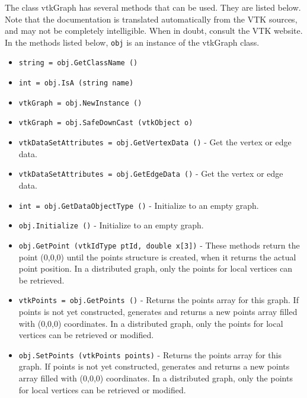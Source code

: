 The class vtkGraph has several methods that can be used.
  They are listed below.
Note that the documentation is translated automatically from the VTK sources,
and may not be completely intelligible.  When in doubt, consult the VTK website.
In the methods listed below, \verb|obj| is an instance of the vtkGraph class.
\begin{itemize}
\item  \verb|string = obj.GetClassName ()|

\item  \verb|int = obj.IsA (string name)|

\item  \verb|vtkGraph = obj.NewInstance ()|

\item  \verb|vtkGraph = obj.SafeDownCast (vtkObject o)|

\item  \verb|vtkDataSetAttributes = obj.GetVertexData ()| -  Get the vertex or edge data.

\item  \verb|vtkDataSetAttributes = obj.GetEdgeData ()| -  Get the vertex or edge data.

\item  \verb|int = obj.GetDataObjectType ()| -  Initialize to an empty graph.

\item  \verb|obj.Initialize ()| -  Initialize to an empty graph.

\item  \verb|obj.GetPoint (vtkIdType ptId, double x[3])| -  These methods return the point (0,0,0) until the points structure
 is created, when it returns the actual point position. In a
 distributed graph, only the points for local vertices can be
 retrieved.

\item  \verb|vtkPoints = obj.GetPoints ()| -  Returns the points array for this graph.
 If points is not yet constructed, generates and returns
 a new points array filled with (0,0,0) coordinates. In a
 distributed graph, only the points for local vertices can be
 retrieved or modified.

\item  \verb|obj.SetPoints (vtkPoints points)| -  Returns the points array for this graph.
 If points is not yet constructed, generates and returns
 a new points array filled with (0,0,0) coordinates. In a
 distributed graph, only the points for local vertices can be
 retrieved or modified.


\end{itemize}
